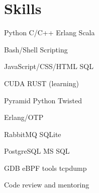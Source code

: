 \begin{minipage}[t]{0.31\textwidth} %

\section{Skills}
\vspace{10pt}
\begin{tightitemize}
\item Python \textbullet{} C/C++ \textbullet{} Erlang \textbullet{} Scala
\item Bash/Shell Scripting
\item JavaScript/CSS/HTML \textbullet{} SQL
\item CUDA \textbullet{} RUST (learning)
\end{tightitemize}

\begin{tightitemize}
\item Pyramid \textbullet{} Python Twisted
\item Erlang/OTP
\end{tightitemize}

\begin{tightitemize}
\item RabbitMQ \textbullet{} SQLite
\item PostgreSQL \textbullet{} MS SQL
\end{tightitemize}

\begin{tightitemize}
\item GDB \textbullet{} eBPF tools \textbullet{} tcpdump
\end{tightitemize}

Code review and mentoring



\end{minipage}
